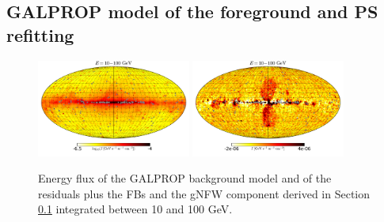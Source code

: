 \subsection{GALPROP model of the foreground and PS refitting}
\label{sec:galprop_model}


\begin{figure}[h]
\centering
\includegraphics[width=0.45\textwidth]{plots/Mollwiede_GALPROP_model_source_range2_log.pdf}
 \includegraphics[width=0.45\textwidth]{plots/Mollwiede_GALPROP_source_range2.pdf}
 \caption{Energy flux of the GALPROP background model 
 and of the residuals plus the FBs and the gNFW component derived in Section \ref{sec:galprop_model}
 integrated between 10 and 100 GeV.}
 \label{fig:Maps_GALPROP}
\end{figure}

